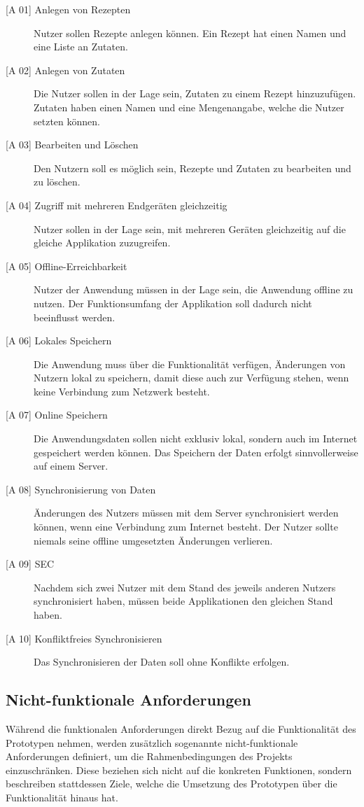 \documentclass[a4paper, 12pt]{scrreprt}
\begin{document}
\begin{description}
	\item[{[A 01]} Anlegen von Rezepten]
	Nutzer sollen Rezepte anlegen können. Ein Rezept hat einen Namen und eine Liste an Zutaten. 
	\item[{[A 02]} Anlegen von Zutaten]
	Die Nutzer sollen in der Lage sein, Zutaten zu einem Rezept hinzuzufügen. Zutaten haben einen Namen und eine Mengenangabe, welche die Nutzer setzten können.
	\item[{[A 03]} Bearbeiten und Löschen]
	Den Nutzern soll es möglich sein, Rezepte und Zutaten zu bearbeiten und zu löschen. 
	\item[{[A 04]} Zugriff mit mehreren Endgeräten gleichzeitig]
	Nutzer sollen in der Lage sein, mit mehreren Geräten gleichzeitig auf die gleiche Applikation zuzugreifen.
	\item[{[A 05]} Offline-Erreichbarkeit]
	Nutzer der Anwendung müssen in der Lage sein, die Anwendung offline zu nutzen. Der Funktionsumfang der Applikation soll dadurch nicht beeinflusst werden. 
	\item[{[A 06]} Lokales Speichern]
	Die Anwendung muss über die Funktionalität verfügen, Änderungen von Nutzern lokal zu speichern, damit diese auch zur Verfügung stehen, wenn keine Verbindung zum Netzwerk besteht.
	\item[{[A 07]} Online Speichern]
	Die Anwendungsdaten sollen nicht exklusiv lokal, sondern auch im Internet gespeichert werden können. Das Speichern der Daten erfolgt sinnvollerweise auf einem Server. 
	\item[{[A 08]} Synchronisierung von Daten]
	Änderungen des Nutzers müssen mit dem Server synchronisiert werden können, wenn eine Verbindung zum Internet besteht. Der Nutzer sollte niemals seine offline umgesetzten Änderungen verlieren.
	\item[{[A 09]} \ac{SEC}] Nachdem sich zwei Nutzer mit dem Stand des jeweils anderen Nutzers synchronisiert haben, müssen beide Applikationen den gleichen Stand haben.
	\item[{{[A 10]} Konfliktfreies Synchronisieren}] Das Synchronisieren der Daten soll ohne Konflikte erfolgen. 
\end{description}


\subsection{Nicht-funktionale Anforderungen}
Während die funktionalen Anforderungen direkt Bezug auf die Funktionalität des Prototypen nehmen, werden zusätzlich sogenannte nicht-funktionale Anforderungen definiert, um die Rahmenbedingungen des Projekts einzuschränken. Diese beziehen sich nicht auf die konkreten Funktionen, sondern beschreiben stattdessen Ziele, welche die Umsetzung des Prototypen über die Funktionalität hinaus hat. 
\end{document}
